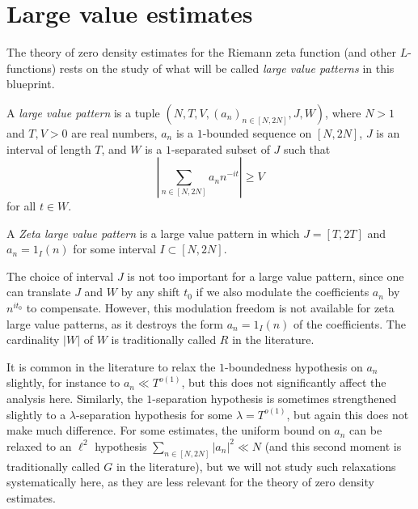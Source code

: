 \chapter{Large value estimates}\label{largevalue-chapter}

The theory of zero density estimates for the Riemann zeta function (and other $L$-functions) rests on the study of what will be called \emph{large value patterns} in this blueprint.

\begin{definition}\label{large-pattern-def}
\leanok
A \emph{large value pattern} is a tuple $(N, T, V, (a_n)_{n \in [N,2N]}, J, W)$, where $N > 1$ and $T, V > 0$ are real numbers, $a_n$ is a $1$-bounded sequence on $[N,2N]$, $J$ is an interval of length $T$, and $W$ is a $1$-separated subset of $J$ such that
\begin{equation}\label{V-large}
        \left|\sum_{n \in [N,2N]} a_n n^{-it} \right| \geq V
\end{equation}
for all $t \in W$.

A \emph{Zeta large value pattern} is a large value pattern in which $J = [T,2T]$ and $a_n = 1_I(n)$ for some interval $I \subset [N,2N]$.
\end{definition}

The choice of interval $J$ is not too important for a large value pattern, since one can translate $J$ and $W$ by any shift $t_0$ if we also modulate the coefficients $a_n$ by $n^{it_0}$ to compensate.  However, this modulation freedom is not available for zeta large value patterns, as it destroys the form $a_n = 1_I(n)$ of the coefficients.  The cardinality $|W|$ of $W$ is traditionally called $R$ in the literature.

It is common in the literature to relax the $1$-boundedness hypothesis on $a_n$ slightly, for instance to $a_n \ll T^{o(1)}$, but this does not significantly affect the analysis here.  Similarly, the $1$-separation hypothesis is sometimes strengthened slightly to a $\lambda$-separation hypothesis for some $\lambda = T^{o(1)}$, but again this does not make much difference.  For some estimates, the uniform bound on $a_n$ can be relaxed to an $\ell^2$ hypothesis $\sum_{n \in [N,2N]} |a_n|^2 \ll N$ (and this second moment is traditionally called $G$ in the literature), but we will not study such relaxations systematically here, as they are less relevant for the theory of zero density estimates.

